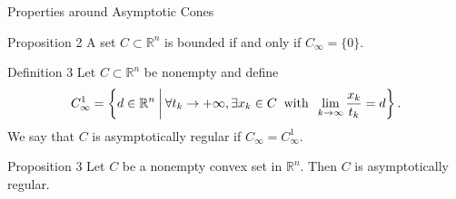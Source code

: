 \documentclass[aspectratio=169, dvipdfmx, 11pt]{beamer} %
\newcommand{\NDemenstionalRealEuclidianSpace}{\mathbb{R}^n}
\begin{document}
\begin{frame}{Properties around Asymptotic Cones}
    \begin{block}{Proposition 2}
    A set $C \subset \mathbb{R}^n$ is bounded if and only if $C_\infty = \{0\}$.
    \end{block}

    \begin{block}{Definition 3}
    Let $C \subset \NDemenstionalRealEuclidianSpace$ be nonempty and define
    \begin{equation}
        C_{\infty}^1 = \left\{d \in \NDemenstionalRealEuclidianSpace \:\middle|\: \forall t_k \rightarrow + \infty , \exists x_k \in C \:\text{ with }\: \lim_{k \to \infty} \frac{x_k}{t_k} = d \right\}. \notag
    \end{equation}
    We say that $C$ is asymptotically regular if $C_{\infty} = C_{\infty}^1$.
    \end{block}

    \begin{block}{Proposition 3}
    Let $C$ be a nonempty convex set in $\NDemenstionalRealEuclidianSpace$. Then $C$ is asymptotically regular.
    \end{block}
\end{frame}
\end{document}
